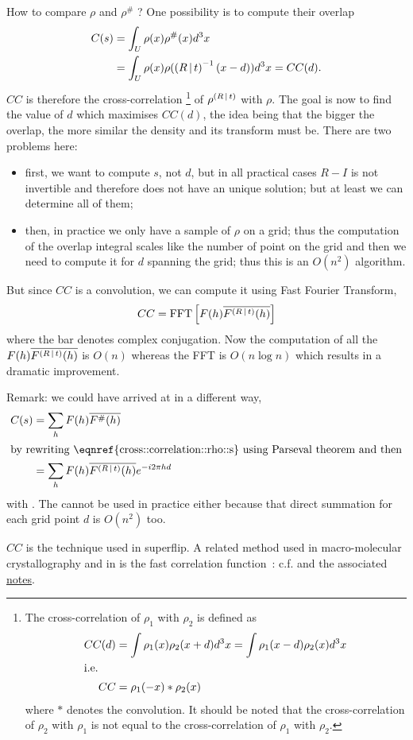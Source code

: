 \documentclass[11pt]{article}
\begin{document}
How to compare $\rho$ and $\rho^\#$ ? One possibility is to compute their overlap
\begin{align}
C(s) &= \int_U \rho(x) \rho^\#(x) d^3x  \label{eqn:cross::correlation::rho::s}\\
&= \int_U \rho(x) \rho(\left( R\,\vert\, t \right)^{-1}(x - d))d^3x = CC(d). \label{eqn:cross::correlation::rho::d}
\end{align}
$CC$ is therefore the cross-correlation%
\footnote{The cross-correlation of $\rho_1$ with $\rho_2$ is defined as
\begin{align}
CC(d) &= \int \rho_1(x) \rho_2(x+d)d^3x = \int \rho_1(x-d) \rho_2(x) d^3x \\
\intertext{i.e.}
CC &= \rho_1(-x) * \rho_2(x)
\end{align}
where $*$ denotes the convolution. It should be noted that the cross-correlation of $\rho_2$ with $\rho_1$ is not equal to the cross-correlation of $\rho_1$ with $\rho_2$.} 
of $\rho^{\left( R\,\vert\, t \right)}$ with $\rho$.
The goal is now to find the value of $d$ which maximises $CC(d)$, the idea being that the bigger the overlap, the more similar the density and its transform must be. There are two problems here:
\begin{itemize}
\item first, we want to compute $s$, not $d$, but in all practical cases $R-I$ is not invertible and therefore  does not have an unique solution; but at least we can determine all of them;
\item then, in practice we only have a sample of $\rho$ on a grid; thus the computation of the overlap integral scales like the number of point on the grid and then we need to compute it for $d$ spanning the grid; thus this is an $O(n^2)$ algorithm.
\end{itemize}
But since $CC$ is a convolution, we can compute it using Fast Fourier Transform,
\newcommand{\tmp}{F(h)\overline{F^{\sym{R}{t}}(h)}}
\begin{equation}
CC = \fourier{\tmp}\label{eqn:CC:as::FFT}
\end{equation}
where the bar denotes complex conjugation. Now the computation of all the $\tmp$ is $O(n)$ whereas the FFT is $O(n\log n)$ which results in a dramatic improvement.

Remark: we could have arrived at  in a different way,
\begin{align}
C(s) &= \sum_h F(h)\overline{F^\#(h)} \label{eqn:cross::correlation::F}\\
\intertext{by rewriting \eqnref{cross::correlation::rho::s} using Parseval theorem and then}
&= \sum_h F(h) \overline{F^{\sym{R}{t}}(h)} e^{-i2\pi hd}
\end{align}
with . The  cannot be used in practice either because that direct summation for each grid point $d$ is $O(n^2)$ too.

$CC$ is the technique used in superflip. A related method used in macro-molecular crystallography and in  is the fast correlation function~\cite{J.Navaza:1995}: c.f.  and the associated \href{file://../translation_search/notes.pdf}{notes}.


\end{document}

